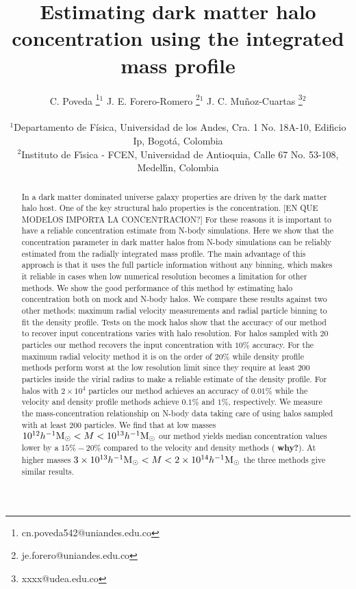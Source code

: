 \documentclass[a4,useAMS,usenatbib,usegraphicx]{mn2e}
\newcommand{\hMsun}{{\ifmmode{h^{-1}{\rm {M_{\odot}}}}\else{$h^{-1}{\rm{M_{\odot}}}$}\fi}}
\begin{document}
\title{Estimating dark matter halo concentration using the integrated
  mass profile} 
\author[C. Poveda, J.E. Forero-Romero, J.C. Mu\~noz-Cuartas]{
\parbox[t]{\textwidth}{\raggedright 
  C. Poveda \thanks{cn.poveda542@uniandes.edu.co}$^{1}$
  J. E. Forero-Romero \thanks{je.forero@uniandes.edu.co}$^{1}$
  J. C. Mu\~noz-Cuartas \thanks{xxxx@udea.edu.co}$^{2}$
}
\vspace*{6pt}\\
$^1$Departamento de F\'{i}sica, Universidad de los Andes, Cra. 1
No. 18A-10, Edificio Ip, Bogot\'a, Colombia\\
$^2$Instituto de F\'{\i}sica - FCEN, Universidad de Antioquia, Calle
67 No. 53-108, Medell\'{\i}n, Colombia
}

\maketitle

\begin{abstract}

In a dark matter dominated universe galaxy properties are driven by
the dark matter halo host.
One of the key structural halo properties is the concentration. 
[EN QUE MODELOS IMPORTA LA CONCENTRACION?]
For these reasons it is important to have a reliable concentration
estimate from N-body simulations. 
Here we show that the concentration parameter in dark matter halos from
N-body simulations can be reliably estimated from the radially integrated mass
profile.
The main advantage of this approach is that it uses the full
particle information without any binning, which makes it reliable in
cases when low numerical resolution becomes a limitation for other
methods.   
We show the good performance of this method by estimating halo
concentration both on mock and N-body halos. 
We compare these results against two other methods:
maximum radial velocity measurements and radial particle binning to
fit the density profile. 
Tests on  the mock halos show that the accuracy of our method to recover input
concentrations varies with halo resolution. For halos
sampled with $20$ particles our method recovers the input
concentration with $10\%$ accuracy. 
For the maximum radial velocity method it is on the order of $20\%$
while density profile methods perform worst at the low resolution
limit since they require at least 200 particles inside the virial
radius to make a reliable estimate of the density profile. 
For halos with $2\times 10^4$ particles our method achieves an
accuracy of $0.01\%$ while the velocity and density profile methods
achieve $0.1\%$ and $1\%$, respectively. 
We measure the mass-concentration relationship on N-body
data taking care of using halos sampled with at least $200$
particles. We find that at low masses $10^{12}\hMsun <
M<10^{13}\hMsun$ our method yields median concentration values lower
by a $15\%-20\%$ compared to the velocity and density methods ({\bf
  why?}).  
At higher masses $3\times 10^{13}\hMsun < M < 2\times
10^{14}\hMsun$ the three methods give similar results.
\end{abstract}
\end{document}
